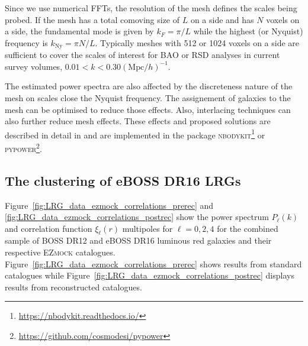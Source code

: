 Since we use numerical FFTs, the resolution of the mesh defines the scales being probed. 
If the mesh has a total comoving size of $L$ on a side and has $N$ voxels on a side, 
the fundamental mode is given by $k_F = \pi/L$ while the highest (or Nyquist) frequency is $k_\text{Ny} = \pi N/L$. 
Typically meshes with 512 or 1024 voxels on a side are sufficient to cover the scales of interest 
for BAO or RSD analyses in current survey volumes, $0.01 < k < 0.30 (\text{Mpc}/h)^{-1}$. 

The estimated power spectra are also affected by the discreteness nature of the mesh on scales close 
the Nyquist frequency. The assignement of galaxies to the mesh can be optimised to reduce those effects. 
Also, interlacing techniques can also further reduce mesh effects. 
These effects and proposed solutions are described in detail in \cite{sefusattiAccurateEstimatorsCorrelation2016}
and are implemented in the package \textsc{nbodykit}\footnote{\url{https://nbodykit.readthedocs.io/}}
or \textsc{pypower}\footnote{\url{https://github.com/cosmodesi/pypower}}. 

\subsection{The clustering of eBOSS DR16 LRGs}
\label{galaxies:clustering:eboss_dr16_lrgs}

Figure~\ref{fig:LRG_data_ezmock_correlations_prerec} and \ref{fig:LRG_data_ezmock_correlations_postrec}
show the power spectrum $P_\ell(k)$ and correlation function $\xi_\ell(r)$ multipoles for $\ell = 0, 2, 4$
for the combined sample of BOSS DR12 and eBOSS DR16 luminous red galaxies and their respective \textsc{EZmock}
catalogues. Figure~\ref{fig:LRG_data_ezmock_correlations_prerec} shows results from standard catalogues while 
Figure~\ref{fig:LRG_data_ezmock_correlations_postrec} displays results from reconstructed catalogues. 

